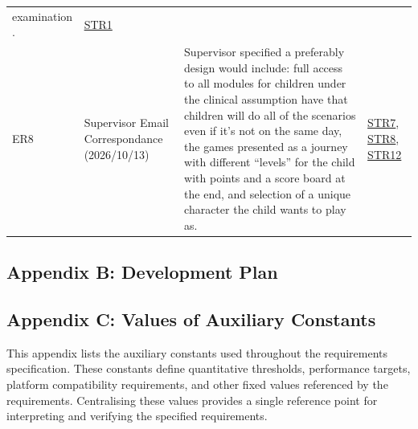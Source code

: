 \documentclass[12pt]{article}
\begin{document}
\begin{longtable}{p{} >{\raggedright\arraybackslash}p{} >{\raggedright\arraybackslash}p{} >{\raggedright\arraybackslash}p{}}
examination \cite{ChiaEtAl2015}.
& \hyperref[SR_Label1]{STR1} \\
ER8\label{ER8}
& Supervisor Email Correspondance (2026/10/13)
& Supervisor specified a preferably design would include: full access to all 
modules for children under the clinical assumption have that children will do 
all of the scenarios even if it's not on the same day, the games presented as 
a journey with different “levels” for the child with points and a score board at 
the end, and selection of a unique character the child wants to play as.
& \hyperref[SR_Label7]{STR7}, \hyperref[SR_Label8]{STR8}, \hyperref[SR_Label12]{STR12} \\

\bottomrule
\end{longtable}

\subsection{Appendix B: Development Plan}


\subsection{Appendix C: Values of Auxiliary Constants}
\label{sec_Constants}

This appendix lists the auxiliary constants used throughout the
requirements specification. These constants define quantitative
thresholds, performance targets, platform compatibility requirements,
and other fixed values referenced by the requirements. Centralising
these values provides a single reference point for interpreting and
verifying the specified requirements.
\end{document}
